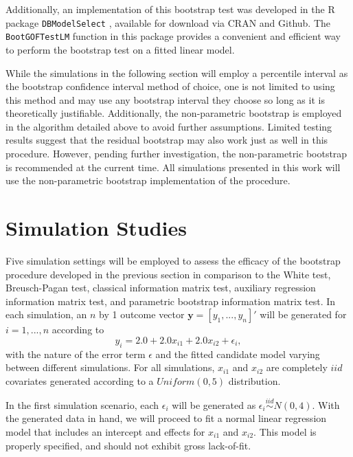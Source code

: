 \documentclass[sn-mathphys-ay]{sn-jnl}
\begin{document}
		Additionally, an implementation of this bootstrap test was developed in the R package \texttt{DBModelSelect} \citep{Koeneman}, available for download via CRAN and Github.
		The \texttt{BootGOFTestLM} function in this package provides a convenient and efficient way to perform the bootstrap test on a fitted linear model.
		
		While the simulations in the following section will employ a percentile interval as the bootstrap confidence interval method of choice, one is not limited to using this method
		and may use any bootstrap interval they choose so long as it is theoretically justifiable. Additionally, the non-parametric bootstrap is employed in the algorithm detailed above to avoid further
		assumptions. Limited testing results suggest that the residual bootstrap may also work just as well in this procedure. However, pending further investigation, the non-parametric
		bootstrap is recommended at the current time. All simulations presented in this work will use the non-parametric bootstrap implementation of the procedure.

\section{Simulation Studies}

Five simulation settings will be employed to assess the efficacy of the bootstrap procedure developed in the previous section in comparison to the White test, Breusch-Pagan test, classical information matrix test, auxiliary regression information matrix test, and parametric bootstrap information matrix test. In each simulation, an $n$ by 1 outcome vector $\bm{y} = [y_1,...,y_n]'$ will
be generated for $i = 1,...,n$ according to
\begin{equation*}
	y_i = 2.0 + 2.0 x_{i1} + 2.0 x_{i2} + \epsilon_i , 
\end{equation*}
with the nature of the error term $\epsilon$ and the fitted candidate model varying between different simulations. For all simulations, $x_{i1}$ and $x_{i2}$ are completely $iid$ covariates generated according to
a $Uniform(0,5)$ distribution.

In the first simulation scenario, each $\epsilon_i$ will be generated as $\epsilon_i \stackrel{iid}{\sim} N(0,4)$. With the generated data in hand, we will proceed to fit a normal linear regression model that includes an intercept and effects for $x_{i1}$ and $x_{i2}$. This model
is properly specified, and should not exhibit gross lack-of-fit.
\end{document}
